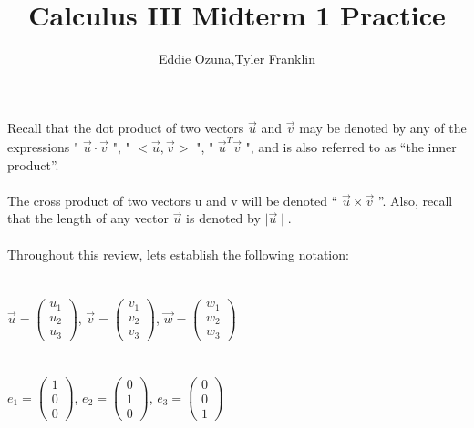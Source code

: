 \documentclass{article}
\title{Calculus III Midterm 1 Practice}
\author{Eddie Ozuna,Tyler Franklin}
\begin{document}
\maketitle

Recall that the dot product of two vectors $\vec{u}$ and $\vec{v}$ may be denoted by any of
the expressions " $\vec{u}\cdot \vec{v}$ ", " $<\vec{u}, \vec{v}>$ ", " $\vec{u}^T \vec{v}$ ", and is also referred to as “the inner product”.
\\
\\
The cross product of two vectors u and v will be denoted “ $\vec{u}\times\vec{v}$ ”.
Also, recall that the length of any vector $\vec{u}$ is denoted by $\mid\vec{u}\mid$.
\\
\\
Throughout this review, lets establish the following notation:\\
\\
\\
$\vec{u}=\left(\!\begin{array}{c}u_{1} \\ u_{2} \\  u_{3}\end{array} \!\right)$,
$\vec{v}=\left(\!\begin{array}{c}v_{1} \\ v_{2} \\  v_{3}\end{array} \!\right)$,
$\vec{w}=\left(\!\begin{array}{c}w_{1} \\ w_{2} \\  w_{3}\end{array} \!\right)$
\\
\\
\\
$e_{1}=\left(\!\begin{array}{c}1 \\ 0 \\  0\end{array} \!\right)$,
$e_{2}=\left(\!\begin{array}{c}0 \\ 1 \\  0\end{array} \!\right)$,
$e_{3}=\left(\!\begin{array}{c}0 \\ 0 \\  1\end{array} \!\right)$
\\
\\
\\
\end{document}
